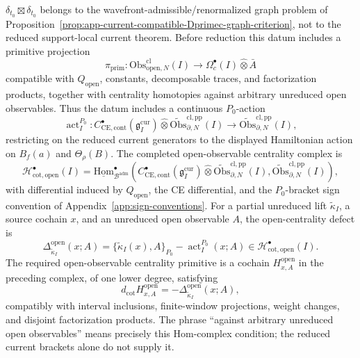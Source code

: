\begin{defn}
\(\delta_{t_0}\boxtimes\delta_{t_0}\) belongs to the
wavefront-admissible/renormalized graph problem of
Proposition~\ref{prop:app-current-compatible-Dprimec-graph-criterion},
not to the reduced support-local current theorem.  Before reduction this
datum includes a primitive
projection
\[
  \pi_{\mathrm{prim}}\colon
  \mathrm{Obs}^{\mathrm{cl}}_{\mathrm{open},N}(I)
  \longrightarrow
  \Omega^\bullet_c(I)\widehat\otimes\bar A
\]
	compatible with \(Q_{\mathrm{open}}\), constants, decomposable traces,
	and factorization products, together with centrality homotopies against
	arbitrary unreduced open observables.
	Thus the datum includes a continuous \(P_0\)-action
	\[
	  \operatorname{act}^{P_0}_I\colon
	  C^\bullet_{\mathrm{CE},\mathrm{cont}}(\mathfrak g_I^{\mathrm{cur}})
	  \widehat\otimes
	  \widetilde{\mathrm{Obs}}^{\mathrm{cl,pp}}_{\partial,N}(I)
	  \longrightarrow
	  \widetilde{\mathrm{Obs}}^{\mathrm{cl,pp}}_{\partial,N}(I),
	\]
	restricting on the reduced current generators to the displayed
	Hamiltonian action on \(B_f(a)\) and \(\Theta_\rho(B)\).  The completed
	open-observable centrality complex is
	\[
	  \mathcal H^\bullet_{\mathrm{cot,open}}(I)
	  =
	  \underline{\mathrm{Hom}}_{\mathcal B^{\mathrm{adm}}}^{\bullet}\!\left(
	  C^\bullet_{\mathrm{CE},\mathrm{cont}}(\mathfrak g_I^{\mathrm{cur}})
	  \widehat\otimes
	  \widetilde{\mathrm{Obs}}^{\mathrm{cl,pp}}_{\partial,N}(I),
	  \widetilde{\mathrm{Obs}}^{\mathrm{cl,pp}}_{\partial,N}(I)\right),
	\]
	with differential induced by \(Q_{\mathrm{open}}\), the CE differential,
	and the \(P_0\)-bracket sign convention of
	Appendix~\ref{app:sign-conventions}.  For a partial unreduced lift
	\(\widetilde\kappa_I\), a source cochain \(x\), and an unreduced open
	observable \(A\), the open-centrality defect is
	\[
	  \Delta^{\mathrm{open}}_{\widetilde\kappa_I}(x;A)
	  =
	  \{\widetilde\kappa_I(x),A\}_{P_0}
	  -
	  \operatorname{act}^{P_0}_I(x;A)
	  \in
	  \mathcal H^\bullet_{\mathrm{cot,open}}(I).
	\]
	The required open-observable centrality primitive is a cochain
	\(H^{\mathrm{open}}_{x,A}\) in the preceding complex, of one lower
	degree, satisfying
	\[
	  d_{\mathrm{cot}}H^{\mathrm{open}}_{x,A}
	  =
	  -\Delta^{\mathrm{open}}_{\widetilde\kappa_I}(x;A),
	\]
	compatibly with interval inclusions, finite-window projections,
	weight changes, and disjoint factorization products.  The phrase
	``against arbitrary unreduced open observables'' means precisely this
	Hom-complex condition; the reduced current brackets alone do not supply
	it.


\end{defn}
